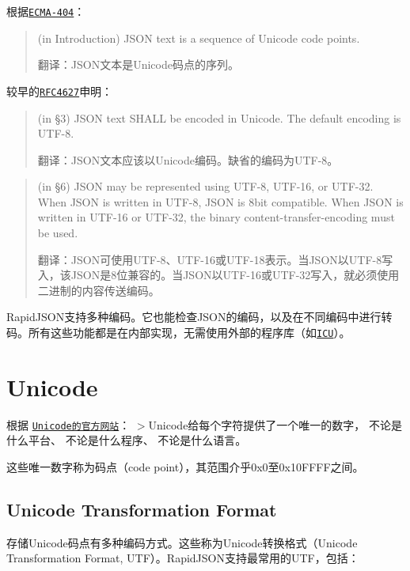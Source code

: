 根据\href{http://www.ecma-international.org/publications/files/ECMA-ST/ECMA-404.pdf}{\tt E\+C\+M\+A-\/404}：

\begin{quote}
(in Introduction) J\+S\+ON text is a sequence of Unicode code points.

翻译：\+J\+S\+O\+N文本是\+Unicode码点的序列。 \end{quote}


较早的\href{http://www.ietf.org/rfc/rfc4627.txt}{\tt R\+F\+C4627}申明：

\begin{quote}
(in §3) J\+S\+ON text S\+H\+A\+LL be encoded in Unicode. The default encoding is U\+T\+F-\/8.

翻译：\+J\+S\+O\+N文本应该以\+Unicode编码。缺省的编码为\+U\+T\+F-\/8。 \end{quote}


\begin{quote}
(in §6) J\+S\+ON may be represented using U\+T\+F-\/8, U\+T\+F-\/16, or U\+T\+F-\/32. When J\+S\+ON is written in U\+T\+F-\/8, J\+S\+ON is 8bit compatible. When J\+S\+ON is written in U\+T\+F-\/16 or U\+T\+F-\/32, the binary content-\/transfer-\/encoding must be used.

翻译：\+J\+S\+O\+N可使用\+U\+T\+F-\/8、\+U\+T\+F-\/16或\+U\+T\+F-\/18表示。当\+J\+S\+O\+N以\+U\+T\+F-\/8写入，该\+J\+S\+O\+N是8位兼容的。当\+J\+S\+O\+N以\+U\+T\+F-\/16或\+U\+T\+F-\/32写入，就必须使用二进制的内容传送编码。 \end{quote}


Rapid\+J\+S\+O\+N支持多种编码。它也能检查\+J\+S\+O\+N的编码，以及在不同编码中进行转码。所有这些功能都是在内部实现，无需使用外部的程序库（如\href{http://site.icu-project.org/}{\tt I\+CU}）。\hypertarget{md_Cadriciel_Commun_Externe_RapidJSON_doc_encoding.zh-cn_Unicode}{}\section{Unicode}\label{md_Cadriciel_Commun_Externe_RapidJSON_doc_encoding.zh-cn_Unicode}
根据 \href{http://www.unicode.org/standard/translations/t-chinese.html}{\tt Unicode的官方网站}： $>$Unicode给每个字符提供了一个唯一的数字， 不论是什么平台、 不论是什么程序、 不论是什么语言。

这些唯一数字称为码点（code point），其范围介乎{\ttfamily 0x0}至{\ttfamily 0x10\+F\+F\+FF}之间。\hypertarget{md_Cadriciel_Commun_Externe_RapidJSON_doc_encoding.zh-cn_UTF}{}\subsection{Unicode Transformation Format}\label{md_Cadriciel_Commun_Externe_RapidJSON_doc_encoding.zh-cn_UTF}
存储\+Unicode码点有多种编码方式。这些称为\+Unicode转换格式（\+Unicode Transformation Format, U\+T\+F）。\+Rapid\+J\+S\+O\+N支持最常用的\+U\+T\+F，包括：



